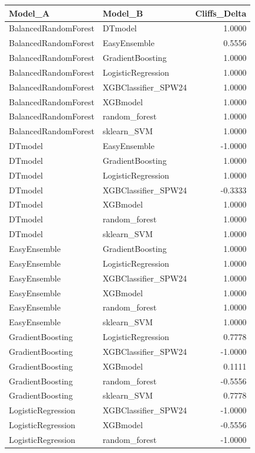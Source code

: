 \begin{table}[t]
\centering
\begin{tabular}{llr}
\toprule
Model_A & Model_B & Cliffs_Delta \\
\midrule
BalancedRandomForest & DTmodel & 1.0000 \\
BalancedRandomForest & EasyEnsemble & 0.5556 \\
BalancedRandomForest & GradientBoosting & 1.0000 \\
BalancedRandomForest & LogisticRegression & 1.0000 \\
BalancedRandomForest & XGBClassifier_SPW24 & 1.0000 \\
BalancedRandomForest & XGBmodel & 1.0000 \\
BalancedRandomForest & random_forest & 1.0000 \\
BalancedRandomForest & sklearn_SVM & 1.0000 \\
DTmodel & EasyEnsemble & -1.0000 \\
DTmodel & GradientBoosting & 1.0000 \\
DTmodel & LogisticRegression & 1.0000 \\
DTmodel & XGBClassifier_SPW24 & -0.3333 \\
DTmodel & XGBmodel & 1.0000 \\
DTmodel & random_forest & 1.0000 \\
DTmodel & sklearn_SVM & 1.0000 \\
EasyEnsemble & GradientBoosting & 1.0000 \\
EasyEnsemble & LogisticRegression & 1.0000 \\
EasyEnsemble & XGBClassifier_SPW24 & 1.0000 \\
EasyEnsemble & XGBmodel & 1.0000 \\
EasyEnsemble & random_forest & 1.0000 \\
EasyEnsemble & sklearn_SVM & 1.0000 \\
GradientBoosting & LogisticRegression & 0.7778 \\
GradientBoosting & XGBClassifier_SPW24 & -1.0000 \\
GradientBoosting & XGBmodel & 0.1111 \\
GradientBoosting & random_forest & -0.5556 \\
GradientBoosting & sklearn_SVM & 0.7778 \\
LogisticRegression & XGBClassifier_SPW24 & -1.0000 \\
LogisticRegression & XGBmodel & -0.5556 \\
LogisticRegression & random_forest & -1.0000 \\

\end{tabular}
\end{table}

